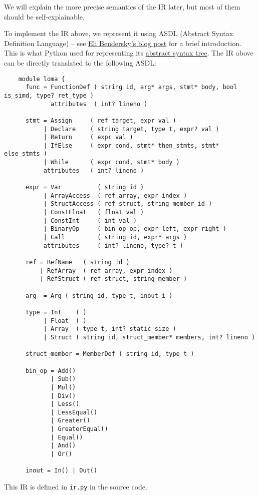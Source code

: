 We will explain the more precise semantics of the IR later, but most of them should be self-explainable.

To implement the IR above, we represent it using ASDL (Abstract Syntax Definition Language) -- see \href{https://eli.thegreenplace.net/2014/06/04/using-asdl-to-describe-asts-in-compilers}{Eli Bendersky's blog post} for a brief introduction. This is what Python used for representing its \href{https://github.com/python/cpython/blob/main/Parser/Python.asdl}{abstract syntax tree}. The IR above can be directly translated to the following ASDL:
\begin{lstlisting}
    module loma {
      func = FunctionDef ( string id, arg* args, stmt* body, bool is_simd, type? ret_type )
             attributes  ( int? lineno )

      stmt = Assign     ( ref target, expr val )
           | Declare    ( string target, type t, expr? val )
           | Return     ( expr val )
           | IfElse     ( expr cond, stmt* then_stmts, stmt* else_stmts )
           | While      ( expr cond, stmt* body )
           attributes   ( int? lineno )

      expr = Var          ( string id )
           | ArrayAccess  ( ref array, expr index )
           | StructAccess ( ref struct, string member_id )
           | ConstFloat   ( float val )
           | ConstInt     ( int val )
           | BinaryOp     ( bin_op op, expr left, expr right )
           | Call         ( string id, expr* args )
           attributes     ( int? lineno, type? t )

      ref = RefName   ( string id )
          | RefArray  ( ref array, expr index )
          | RefStruct ( ref struct, string member )

      arg  = Arg ( string id, type t, inout i )

      type = Int    ( )
           | Float  ( )
           | Array  ( type t, int? static_size )
           | Struct ( string id, struct_member* members, int? lineno )

      struct_member = MemberDef ( string id, type t )

      bin_op = Add()
             | Sub()
             | Mul()
             | Div()
             | Less()
             | LessEqual()
             | Greater()
             | GreaterEqual()
             | Equal()
             | And()
             | Or()

      inout = In() | Out()
\end{lstlisting}
This IR is defined in \lstinline{ir.py} in the source code.

